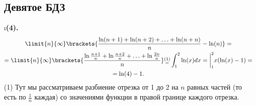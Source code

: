 \subsection{Девятое БДЗ}

\setcounter{iii}{15}

\i \textbf{(4).}
\begin{gather*}
    \limit{n}{\infty} \brackets{\frac{\ln(n+1) + \ln(n+2) + \ldots + \ln(n + n)}{n} - \ln(n)} = \\ = \limit{n}{\infty}\brackets{\frac{\ln{\frac{n+1}{n}} + \ln{\frac{n+2}{n}} + \ldots + \ln{\frac{2n}{n}}}{n}} \substack{(1) \\ =} \int_1^2 \ln(x)dx = \bigg|_1^2 x(\ln(x) - 1) = \\ = \ln(4) - 1.
\end{gather*}
(1) Тут мы рассматриваем разбиение отрезка от 1 до 2 на $n$ равных частей (то есть по $\frac{1}{n}$ каждая) со значениями функции в правой границе каждого отрезка.

